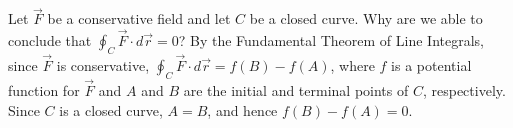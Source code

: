 {Let $\vec F$ be a conservative field and let $C$ be a closed curve. Why are we able to conclude that $\oint _C \vec F\cdot d\vec r = 0$?
}
{By the Fundamental Theorem of Line Integrals, since $\vec F$ is conservative, $\oint_C \vec F\cdot d\vec r = f(B) - f(A)$, where $f$ is a potential function for $\vec F$ and $A$ and $B$ are the initial and terminal points of $C$, respectively. Since $C$ is a closed curve, $A = B$, and hence $f(B) - f(A) = 0$.
}
